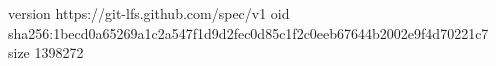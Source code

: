 version https://git-lfs.github.com/spec/v1
oid sha256:1becd0a65269a1c2a547f1d9d2fec0d85c1f2c0eeb67644b2002e9f4d70221c7
size 1398272
